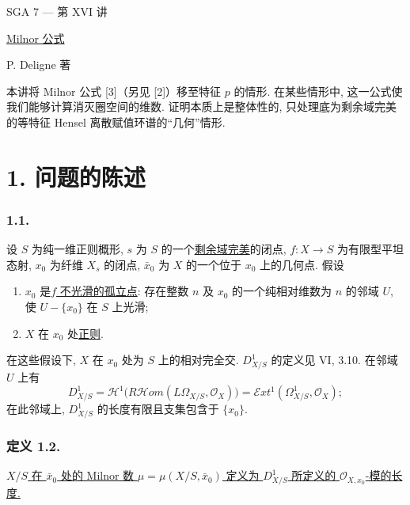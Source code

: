 \clearpage
\ExposeTOC
\begin{center}
{\large SGA 7 --- 第 XVI 讲}\par
\vspace{2em}
{\Large\underline{Milnor 公式}}\par
\vspace{1.5em}
{\large P. Deligne 著}
\end{center}

\medskip
本讲将 Milnor 公式 [3]（另见 [2]）移至特征 $p$ 的情形. 在某些情形中, 这一公式使我们能够计算消灭圈空间的维数. 证明本质上是整体性的, 只处理底为剩余域完美的等特征 Hensel 离散赋值环谱的“几何”情形.

\section*{1. 问题的陈述}

\subsubsection*{1.1.}
设 $S$ 为纯一维正则概形, $s$ 为 $S$ 的一个\underline{剩余域完美}的闭点, $f:X\to S$ 为有限型平坦态射, $x_0$ 为纤维 $X_s$ 的闭点, $\bar x_0$ 为 $X$ 的一个位于 $x_0$ 上的几何点. 假设
\begin{enumerate}
\item[(a)] $x_0$ 是\underline{$f$ 不光滑的孤立点}: 存在整数 $n$ 及 $x_0$ 的一个纯相对维数为 $n$ 的邻域 $U$, 使 $U-\{x_0\}$ 在 $S$ 上光滑;
\item[(b)] $X$ 在 $x_0$ 处\underline{正则}.
\end{enumerate}

在这些假设下, $X$ 在 $x_0$ 处为 $S$ 上的相对完全交. $D^1_{X/S}$ 的定义见 VI, 3.10. 在邻域 $U$ 上有
\[
D^1_{X/S}
=\mathcal H^1\bigl(R\mathcal Hom(L\Omega_{X/S},\mathcal O_X)\bigr)
=\mathcal Ext^1(\Omega^1_{X/S},\mathcal O_X);
\]
在此邻域上, $D^1_{X/S}$ 的长度有限且支集包含于 $\{x_0\}$.

\subsubsection*{定义 1.2.}
\underline{$X/S$ 在 $\bar x_0$ 处的 Milnor 数 $\mu=\mu(X/S,\bar x_0)$ 定义为 $D^1_{X/S}$ 所定义的 $\mathcal O_{X,x_0}$-模的长度.}

